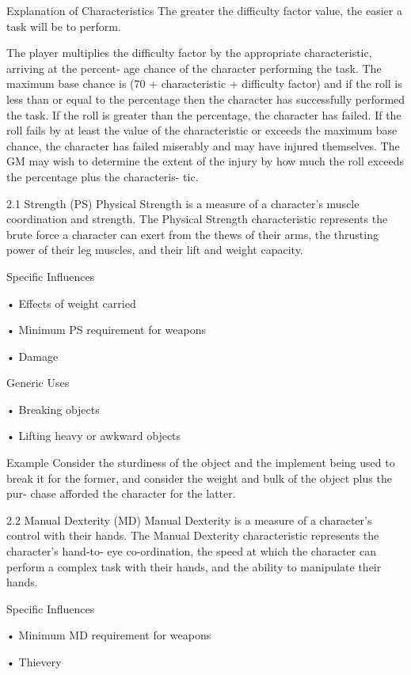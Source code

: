 \begin{Chapter}{Explanation of Characteristics}
The greater the difficulty factor value, the easier a 
task will be to perform. 

The  player  multiplies  the  difficulty  factor  by  the 
appropriate  characteristic,  arriving  at  the  percent-
age  chance  of  the  character  performing  the  task. 
The maximum base chance is (70 + characteristic + 
difficulty  factor)%
and if the roll is less than or equal to the percentage 
then  the  character  has  successfully  performed  the 
task.  If  the  roll  is  greater  than  the  percentage,  the 
character has failed.  If the roll fails  by at least the 
value of the characteristic or exceeds the maximum 
base chance, the character has failed miserably and 
may  have  injured  themselves.  The  GM  may  wish 
to determine the extent of the injury by how much 
the roll exceeds the percentage plus the characteris-
tic. 

2.1 Strength (PS) 
Physical  Strength  is  a  measure  of  a  character’s 
muscle  coordination  and  strength.  The  Physical 
Strength  characteristic  represents  the  brute  force  a 
character  can  exert  from  the  thews  of  their  arms, 
the  thrusting  power  of  their  leg  muscles,  and their 
lift and weight capacity. 

Specific Influences  

• Effects of weight carried  

• Minimum PS requirement for weapons  

• Damage 

Generic Uses  

• Breaking objects  

• Lifting heavy or awkward objects 

Example 
Consider  the  sturdiness  of  the  object  and 
the  implement  being  used  to  break  it  for  the  former,  and 
consider  the  weight  and  bulk  of  the  object  plus  the  pur-
chase afforded the character for the latter. 

2.2 Manual Dexterity (MD) 
Manual  Dexterity  is  a  measure  of  a  character’s 
control  with  their  hands.  The  Manual  Dexterity 
characteristic  represents  the  character’s  hand-to-
eye co-ordination, the speed at which the character 
can  perform  a  complex  task  with  their  hands,  and 
the ability to manipulate their hands. 

Specific Influences  

• Minimum MD requirement for weapons  

• Thievery  


\end{Chapter}
